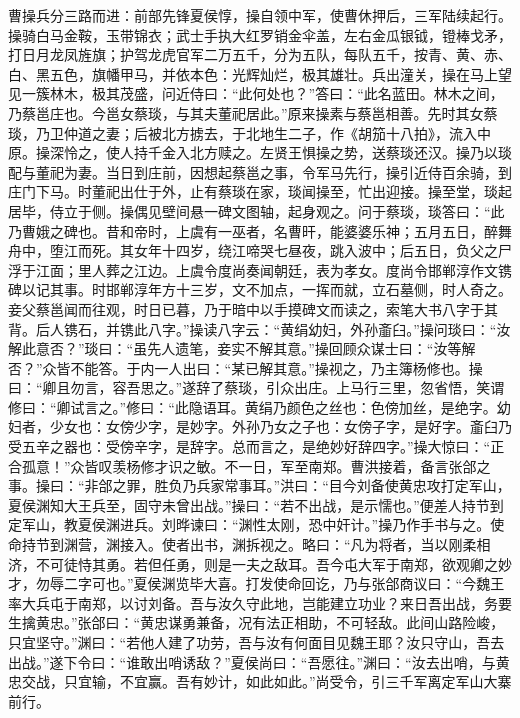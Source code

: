 曹操兵分三路而进：前部先锋夏侯惇，操自领中军，使曹休押后，三军陆续起行。操骑白马金鞍，玉带锦衣；武士手执大红罗销金伞盖，左右金瓜银钺，镫棒戈矛，打日月龙凤旌旗；护驾龙虎官军二万五千，分为五队，每队五千，按青、黄、赤、白、黑五色，旗幡甲马，并依本色：光辉灿烂，极其雄壮。兵出潼关，操在马上望见一簇林木，极其茂盛，问近侍曰：“此何处也？”答曰：“此名蓝田。林木之间，乃蔡邕庄也。今邕女蔡琰，与其夫董祀居此。”原来操素与蔡邕相善。先时其女蔡琰，乃卫仲道之妻；后被北方掳去，于北地生二子，作《胡笳十八拍》，流入中原。操深怜之，使人持千金入北方赎之。左贤王惧操之势，送蔡琰还汉。操乃以琰配与董祀为妻。当日到庄前，因想起蔡邕之事，令军马先行，操引近侍百余骑，到庄门下马。时董祀出仕于外，止有蔡琰在家，琰闻操至，忙出迎接。操至堂，琰起居毕，侍立于侧。操偶见壁间悬一碑文图轴，起身观之。问于蔡琰，琰答曰：“此乃曹娥之碑也。昔和帝时，上虞有一巫者，名曹旰，能婆婆乐神；五月五日，醉舞舟中，堕江而死。其女年十四岁，绕江啼哭七昼夜，跳入波中；后五日，负父之尸浮于江面；里人葬之江边。上虞令度尚奏闻朝廷，表为孝女。度尚令邯郸淳作文镌碑以记其事。时邯郸淳年方十三岁，文不加点，一挥而就，立石墓侧，时人奇之。妾父蔡邕闻而往观，时日已暮，乃于暗中以手摸碑文而读之，索笔大书八字于其背。后人镌石，并镌此八字。”操读八字云：“黄绢幼妇，外孙齑臼。”操问琰曰：“汝解此意否？”琰曰：“虽先人遗笔，妾实不解其意。”操回顾众谋士曰：“汝等解否？”众皆不能答。于内一人出曰：“某已解其意。”操视之，乃主簿杨修也。操曰：“卿且勿言，容吾思之。”遂辞了蔡琰，引众出庄。上马行三里，忽省悟，笑谓修曰：“卿试言之。”修曰：“此隐语耳。黄绢乃颜色之丝也：色傍加丝，是绝字。幼妇者，少女也：女傍少字，是妙字。外孙乃女之子也：女傍子字，是好字。齑臼乃受五辛之器也：受傍辛字，是辞字。总而言之，是绝妙好辞四字。”操大惊曰：“正合孤意！”众皆叹羡杨修才识之敏。不一日，军至南郑。曹洪接着，备言张郃之事。操曰：“非郃之罪，胜负乃兵家常事耳。”洪曰：“目今刘备使黄忠攻打定军山，夏侯渊知大王兵至，固守未曾出战。”操曰：“若不出战，是示懦也。”便差人持节到定军山，教夏侯渊进兵。刘晔谏曰：“渊性太刚，恐中奸计。”操乃作手书与之。使命持节到渊营，渊接入。使者出书，渊拆视之。略曰：“凡为将者，当以刚柔相济，不可徒恃其勇。若但任勇，则是一夫之敌耳。吾今屯大军于南郑，欲观卿之妙才，勿辱二字可也。”夏侯渊览毕大喜。打发使命回讫，乃与张郃商议曰：“今魏王率大兵屯于南郑，以讨刘备。吾与汝久守此地，岂能建立功业？来日吾出战，务要生擒黄忠。”张郃曰：“黄忠谋勇兼备，况有法正相助，不可轻敌。此间山路险峻，只宜坚守。”渊曰：“若他人建了功劳，吾与汝有何面目见魏王耶？汝只守山，吾去出战。”遂下令曰：“谁敢出哨诱敌？”夏侯尚曰：“吾愿往。”渊曰：“汝去出哨，与黄忠交战，只宜输，不宜赢。吾有妙计，如此如此。”尚受令，引三千军离定军山大寨前行。

